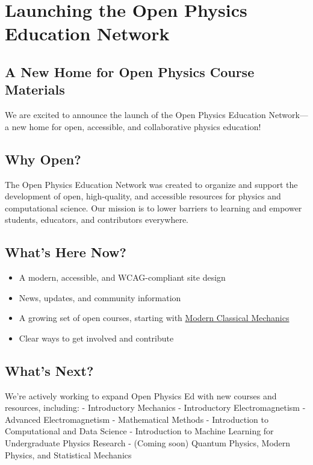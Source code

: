 \section{Launching the Open Physics Education
Network}\label{launching-the-open-physics-education-network}

\subsection{A New Home for Open Physics Course
Materials}\label{a-new-home-for-open-physics-course-materials}

We are excited to announce the launch of the Open Physics Education
Network---a new home for open, accessible, and collaborative physics
education!

\subsection{Why Open?}\label{why-open}

The Open Physics Education Network was created to organize and support
the development of open, high-quality, and accessible resources for
physics and computational science. Our mission is to lower barriers to
learning and empower students, educators, and contributors everywhere.

\subsection{What's Here Now?}\label{whats-here-now}

\begin{itemize}
\tightlist
\item
  A modern, accessible, and WCAG-compliant site design
\item
  News, updates, and community information
\item
  A growing set of open courses, starting with
  \href{https://dannycaballero.info/modern-classical-mechanics/}{Modern
  Classical Mechanics}
\item
  Clear ways to get involved and contribute
\end{itemize}

\subsection{What's Next?}\label{whats-next}

We're actively working to expand Open Physics Ed with new courses and
resources, including: - Introductory Mechanics - Introductory
Electromagnetism - Advanced Electromagnetism - Mathematical Methods -
Introduction to Computational and Data Science - Introduction to Machine
Learning for Undergraduate Physics Research - (Coming soon) Quantum
Physics, Modern Physics, and Statistical Mechanics

